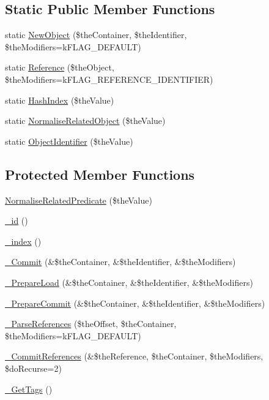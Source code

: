 \subsection*{Static Public Member Functions}
\begin{DoxyCompactItemize}
\item 
static \hyperlink{class_c_persistent_unit_object_ab3e33158e9b08a45f3a0b71feb922f50}{New\-Object} (\$the\-Container, \$the\-Identifier, \$the\-Modifiers=k\-F\-L\-A\-G\-\_\-\-D\-E\-F\-A\-U\-L\-T)
\item 
static \hyperlink{class_c_persistent_unit_object_a45700a911c2266de6e562cdd62c3c777}{Reference} (\$the\-Object, \$the\-Modifiers=k\-F\-L\-A\-G\-\_\-\-R\-E\-F\-E\-R\-E\-N\-C\-E\-\_\-\-I\-D\-E\-N\-T\-I\-F\-I\-E\-R)
\item 
static \hyperlink{class_c_persistent_unit_object_af0e75c386b883074c8bb677bac500bb3}{Hash\-Index} (\$the\-Value)
\item 
static \hyperlink{class_c_persistent_unit_object_abdf69880df0ce8257c4d0fd64adc7053}{Normalise\-Related\-Object} (\$the\-Value)
\item 
static \hyperlink{class_c_persistent_unit_object_ac7bfe8f6475e61abb2e9de9c112cbfe6}{Object\-Identifier} (\$the\-Value)
\end{DoxyCompactItemize}
\subsection*{Protected Member Functions}
\begin{DoxyCompactItemize}
\item 
\hyperlink{class_c_persistent_unit_object_ada043fb875e4ec40b6c36eef689ab2a6}{Normalise\-Related\-Predicate} (\$the\-Value)
\item 
\hyperlink{class_c_persistent_unit_object_ad1ca0920cf0df3c24351402f9afbf34b}{\-\_\-id} ()
\item 
\hyperlink{class_c_persistent_unit_object_a5166fdce0b1be6a3e4889f20c5f1c2dd}{\-\_\-index} ()
\item 
\hyperlink{class_c_persistent_unit_object_ae8726af138967ed9b4b2edbfa2a188a3}{\-\_\-\-Commit} (\&\$the\-Container, \&\$the\-Identifier, \&\$the\-Modifiers)
\item 
\hyperlink{class_c_persistent_unit_object_a5f41b9143a5ae8fb353989c26d4ee301}{\-\_\-\-Prepare\-Load} (\&\$the\-Container, \&\$the\-Identifier, \&\$the\-Modifiers)
\item 
\hyperlink{class_c_persistent_unit_object_aaa69a5dd56c441027197d5cb677972ad}{\-\_\-\-Prepare\-Commit} (\&\$the\-Container, \&\$the\-Identifier, \&\$the\-Modifiers)
\item 
\hyperlink{class_c_persistent_unit_object_ae74127a9fb936d8cf5aeed30315ac05b}{\-\_\-\-Parse\-References} (\$the\-Offset, \$the\-Container, \$the\-Modifiers=k\-F\-L\-A\-G\-\_\-\-D\-E\-F\-A\-U\-L\-T)
\item 
\hyperlink{class_c_persistent_unit_object_ac5766758d07f7ee985fd2699b8d99fce}{\-\_\-\-Commit\-References} (\&\$the\-Reference, \$the\-Container, \$the\-Modifiers, \$do\-Recurse=2)
\item 
\hyperlink{class_c_persistent_unit_object_ac4df6b15733c79b93493131275a27493}{\-\_\-\-Get\-Tags} ()
\end{DoxyCompactItemize}


